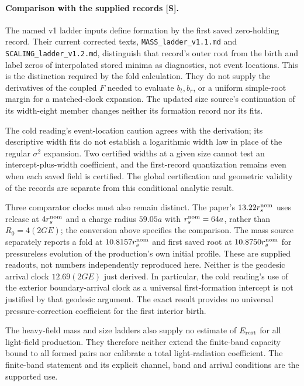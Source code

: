 \documentclass[11pt]{article}
\begin{document}
\paragraph{Comparison with the supplied records [S].}
The named v1 ladder inputs define formation by the first saved
zero-holding record. Their current corrected texts,
\texttt{MASS\_ladder\_v1.1.md} and
\texttt{SCALING\_ladder\_v1.2.md}, distinguish that record's outer root
from the birth and label zeros of interpolated stored minima as
diagnostics, not event locations. This is the distinction required by
the fold calculation. They do not supply the derivatives of the
coupled $F$ needed to evaluate $b_t,b_r$, or a uniform simple-root
margin for a matched-clock expansion. The updated size source's
continuation of its width-eight member changes neither its formation
record nor its fits.

The cold reading's event-location caution agrees with the derivation;
its descriptive width fits do not establish a logarithmic width law
in place of the regular $\sigma^2$ expansion. Two certified widths at
a given size cannot test an intercept-plus-width coefficient, and
the first-record quantization remains even when each saved field is
certified. The global certification and geometric validity of the
records are separate from this conditional analytic result.

Three comparator clocks must also remain distinct. The paper's
$13.22r_s^{\rm nom}$ uses release at $4r_s^{\rm nom}$ and a charge
radius $59.05a$ with $r_s^{\rm nom}=64a$, rather than $R_0=4(2GE)$;
the conversion above specifies the comparison. The mass source
separately reports a fold at $10.8157r_s^{\rm nom}$ and first saved
root at $10.8750r_s^{\rm nom}$ for pressureless evolution of the
production's own initial profile. These are supplied readouts, not
numbers independently reproduced here. Neither is the geodesic
arrival clock $12.69(2GE)$ just derived. In particular, the cold
reading's use of the exterior boundary-arrival clock as a universal
first-formation intercept is not justified by that geodesic argument.
The exact result provides no universal pressure-correction coefficient
for the first interior birth.

The heavy-field mass and size ladders also supply no estimate of
$E_{\rm rest}$ for all light-field production. They therefore neither
extend the finite-band capacity bound to all formed pairs nor
calibrate a total light-radiation coefficient. The
finite-band statement and its explicit channel, band and arrival
conditions are the supported use.
\end{document}
